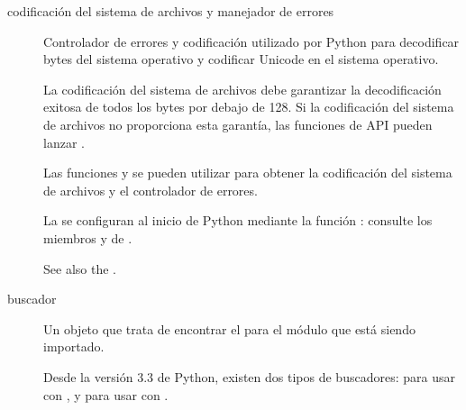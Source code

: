 \documentclass[a4,10pt,spanish]{sphinxmanual}
\begin{document}
\begin{description}
\item[{codificación del sistema de archivos y manejador de errores\label{\detokenize{glossary:term-filesystem-encoding-and-error-handler}}}] \leavevmode
\sphinxAtStartPar
Controlador de errores y codificación utilizado por Python para decodificar bytes del sistema operativo y codificar Unicode en el sistema operativo.

\sphinxAtStartPar
La codificación del sistema de archivos debe garantizar la decodificación exitosa de todos los bytes por debajo de 128. Si la codificación del sistema de archivos no proporciona esta garantía, las funciones de API pueden lanzar .

\sphinxAtStartPar
Las funciones  y  se pueden utilizar para obtener la codificación del sistema de archivos y el controlador de errores.

\sphinxAtStartPar
La {\hyperref[\detokenize{glossary:term-filesystem-encoding-and-error-handler}]{}} se configuran al inicio de Python mediante la función : consulte los miembros  y  de .

\sphinxAtStartPar
See also the {\hyperref[\detokenize{glossary:term-locale-encoding}]{}}.

\item[{buscador\label{\detokenize{glossary:term-finder}}}] \leavevmode
\sphinxAtStartPar
Un objeto que trata de encontrar el {\hyperref[\detokenize{glossary:term-loader}]{}} para el módulo que está siendo importado.

\sphinxAtStartPar
Desde la versión 3.3 de Python, existen dos tipos de buscadores: {\hyperref[\detokenize{glossary:term-meta-path-finder}]{}} para usar con , y {\hyperref[\detokenize{glossary:term-path-entry-finder}]{}} para usar con  .


\end{description}
\end{document}
